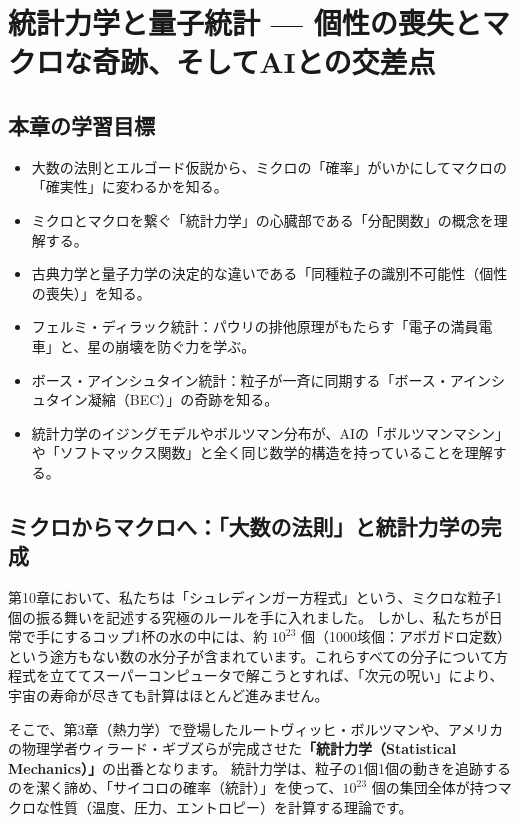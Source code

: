 \chapter{統計力学と量子統計 --- 個性の喪失とマクロな奇跡、そしてAIとの交差点}

\section*{本章の学習目標}
\begin{itemize}
\item 大数の法則とエルゴード仮説から、ミクロの「確率」がいかにしてマクロの「確実性」に変わるかを知る。
\item ミクロとマクロを繋ぐ「統計力学」の心臓部である「分配関数」の概念を理解する。
\item 古典力学と量子力学の決定的な違いである「同種粒子の識別不可能性（個性の喪失）」を知る。
\item フェルミ・ディラック統計：パウリの排他原理がもたらす「電子の満員電車」と、星の崩壊を防ぐ力を学ぶ。
\item ボース・アインシュタイン統計：粒子が一斉に同期する「ボース・アインシュタイン凝縮（BEC）」の奇跡を知る。
\item 統計力学のイジングモデルやボルツマン分布が、AIの「ボルツマンマシン」や「ソフトマックス関数」と全く同じ数学的構造を持っていることを理解する。
\end{itemize}

\section{ミクロからマクロへ：「大数の法則」と統計力学の完成}

第10章において、私たちは「シュレディンガー方程式」という、ミクロな粒子1個の振る舞いを記述する究極のルールを手に入れました。 しかし、私たちが日常で手にするコップ1杯の水の中には、約 \ensuremath{10^{23}} 個（1000垓個：アボガドロ定数）という途方もない数の水分子が含まれています。これらすべての分子について方程式を立ててスーパーコンピュータで解こうとすれば、「次元の呪い」により、宇宙の寿命が尽きても計算はほとんど進みません。

そこで、第3章（熱力学）で登場したルートヴィッヒ・ボルツマンや、アメリカの物理学者ウィラード・ギブズらが完成させた\textbf{「統計力学（Statistical Mechanics）」}の出番となります。 統計力学は、粒子の1個1個の動きを追跡するのを潔く諦め、「サイコロの確率（統計）」を使って、\ensuremath{10^{23}} 個の集団全体が持つマクロな性質（温度、圧力、エントロピー）を計算する理論です。

